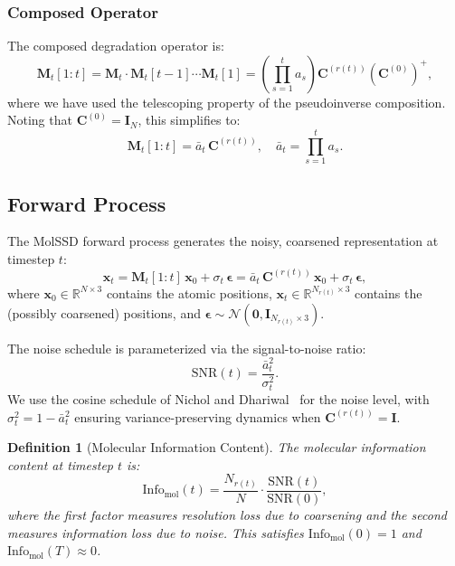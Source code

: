 \documentclass[12pt,a4paper]{article}
\newtheorem{definition}[theorem]{Definition}
\providecommand{\R}{}
\renewcommand{\R}{\mathbb{R}}
\newcommand{\SNR}{\mathrm{SNR}}
\newcommand{\Info}{\mathrm{Info}}
\newcommand{\bx}{\bm{x}}
\newcommand{\bep}{\bm{\epsilon}}
\newcommand{\cN}{\mathcal{N}}
\newcommand{\Mt}{\bm{M}_t}
\begin{document}
\subsubsection{Composed Operator}

The composed degradation operator is:
\begin{equation}\label{eq:composed_M}
    \Mt[1:t] = \Mt \cdot \Mt[t-1] \cdots \Mt[1] = \left(\prod_{s=1}^t a_s\right) \bm{C}^{(r(t))} \left(\bm{C}^{(0)}\right)^+,
\end{equation}
where we have used the telescoping property of the pseudoinverse composition. Noting that $\bm{C}^{(0)} = \bm{I}_N$, this simplifies to:
\begin{equation}\label{eq:composed_M_simple}
    \Mt[1:t] = \bar{a}_t\, \bm{C}^{(r(t))}, \quad \bar{a}_t = \prod_{s=1}^t a_s.
\end{equation}

\subsection{Forward Process}\label{sec:forward}

The MolSSD forward process generates the noisy, coarsened representation at timestep $t$:
\begin{equation}\label{eq:molssd_forward}
    \bx_t = \Mt[1:t]\, \bx_0 + \sigma_t\, \bep = \bar{a}_t\, \bm{C}^{(r(t))}\, \bx_0 + \sigma_t\, \bep,
\end{equation}
where $\bx_0 \in \R^{N \times 3}$ contains the atomic positions, $\bx_t \in \R^{N_{r(t)} \times 3}$ contains the (possibly coarsened) positions, and $\bep \sim \cN(\bm{0}, \bm{I}_{N_{r(t)} \times 3})$.

The noise schedule is parameterized via the signal-to-noise ratio:
\begin{equation}\label{eq:snr_schedule}
    \SNR(t) = \frac{\bar{a}_t^2}{\sigma_t^2}.
\end{equation}
We use the cosine schedule of Nichol and Dhariwal~\cite{nichol2021improved} for the noise level, with $\sigma_t^2 = 1 - \bar{a}_t^2$ ensuring variance-preserving dynamics when $\bm{C}^{(r(t))} = \bm{I}$.

\begin{definition}[Molecular Information Content]\label{def:info_mol}
The molecular information content at timestep $t$ is:
\begin{equation}\label{eq:info_mol}
    \Info_{\mathrm{mol}}(t) = \frac{N_{r(t)}}{N} \cdot \frac{\SNR(t)}{\SNR(0)},
\end{equation}
where the first factor measures resolution loss due to coarsening and the second measures information loss due to noise. This satisfies $\Info_{\mathrm{mol}}(0) = 1$ and $\Info_{\mathrm{mol}}(T) \approx 0$.
\end{definition}
\end{document}
